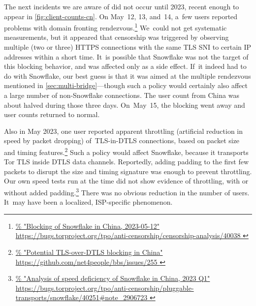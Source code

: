 \documentclass[letterpaper,twocolumn]{article}
\newlength{\urlfootnotesize}
\newcommand{\urlfootnote}[1]{\footnote{
\raggedright\hangindent\footnotemargin%
\fontsize{\urlfootnotesize}{\urlfootnotesize}\selectfont%
\url{#1}
}}
\begin{document}
The next incidents we are aware of did not occur until 2023,
recent enough to appear in \autoref{fig:client-counts-cn}.
On May~12, 13, and~14, a~few users reported problems
with domain fronting rendezvous.\urlfootnote{
https://bugs.torproject.org/tpo/anti-censorship/censorship-analysis/40038
}
We~could not get systematic measurements,
but it appeared that censorship was triggered
by observing multiple (two or three) HTTPS connections
with the same TLS SNI to certain IP addresses within a short time.
It~is possible that Snowflake was not the target of this
blocking behavior, and was affected only as a side effect.
If~it indeed had to do with Snowflake,
our best guess is that it was aimed at the multiple rendezvous
mentioned in \autoref{sec:multi-bridge}---though such a
policy would certainly also affect a large number of non-Snowflake connections.
The user count from China was about halved during those three days.
On~May~15, the blocking went away and user counts returned to normal.

Also in May 2023, one user reported apparent throttling
(artificial reduction in speed by packet dropping)
of~TLS-in-DTLS connections,
based on packet size and timing features.\urlfootnote{
https://github.com/net4people/bbs/issues/255
}
Such a policy would affect Snowflake,
because it transports Tor TLS inside DTLS data channels.
Reportedly, adding padding to the first few packets
to disrupt the size and timing signature was enough
to prevent throttling.
Our own speed tests run at the time
did not show evidence of throttling,
with or without added padding.\urlfootnote{
https://bugs.torproject.org/tpo/anti-censorship/pluggable-transports/snowflake/40251\#note_2906723
}
There was no obvious reduction in the number of users.
It~may have been a localized, ISP-specific phenomenon.

\end{document}
